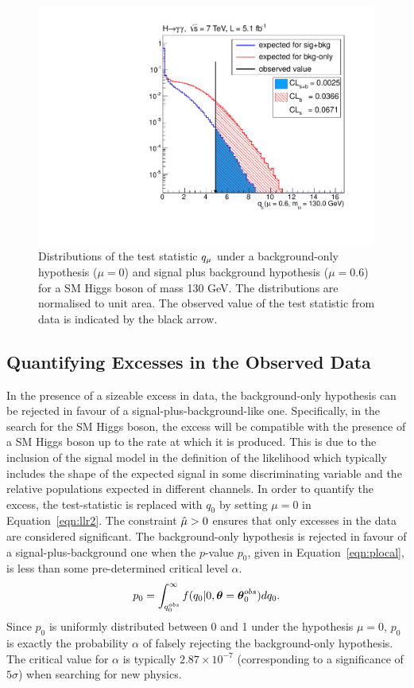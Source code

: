 \begin{figure}
\begin{center}
  \includegraphics[width=.8\textwidth]{hgg7TeV/statsPlots/qmu_example_130.pdf}
\end{center}
 \caption{Distributions of the test statistic $q_{\mu}$ under a background-only hypothesis
 ($\mu=0$) and signal plus background hypothesis ($\mu=0.6$) for a SM Higgs boson of mass 130 GeV. 
 The distributions are normalised to unit area. The observed value of the test statistic 
 from data is indicated by the black arrow.}
 \label{fig:qmuexample}
\end{figure}

\subsection{Quantifying Excesses in the Observed Data}

In the presence of a sizeable excess in data, the background-only hypothesis
can be rejected in favour of a signal-plus-background-like one. Specifically, in 
the search for the SM Higgs boson, the excess 
will be compatible with the presence of a SM Higgs boson up to the rate
at which it is produced. This is due to the inclusion of the signal model 
in the definition of the likelihood which typically includes the shape of 
the expected signal in some discriminating variable and the relative populations
expected in different channels.
In order to quantify the excess, the test-statistic
is replaced with $q_{0}$ by setting $\mu=0$ in Equation~\ref{eqn:llr2}.
The constraint $\hat{\mu}>0$ ensures that only excesses in the data are considered significant.
The background-only hypothesis is rejected in favour of a signal-plus-background one
when the $p$-value $p_{0}$, given in Equation~\ref{eqn:plocal},
is less than some pre-determined critical level $\alpha$.
\begin{equation}
  p_{0} = \int_{q_{0}^{obs}}^{\infty} f(q_{0} |0,{\boldsymbol{\theta}}={\boldsymbol{\theta}}_{0}^{obs}) dq_{0}.
\label{eqn:plocal}
\end{equation}
Since $p_{0}$ is uniformly distributed between 0 and 1 under the hypothesis $\mu=0$,
$p_{0}$ is exactly the probability $\alpha$ of falsely rejecting the background-only hypothesis. 
The critical value for $\alpha$ is typically $2.87\times10^{-7}$ (corresponding 
to a significance of $5\sigma$) when searching for new physics.  


